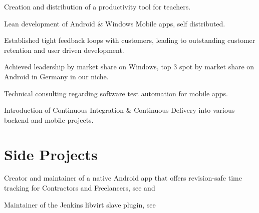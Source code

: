 \documentclass[]{resume}
\begin{document}
\begin{minipage}[t]{0.64\textwidth}
\begin{tightemize}
\item Creation and distribution of a productivity tool for teachers.
\item Lean development of Android \& Windows Mobile apps, self distributed.
\item Established tight feedback loops with customers, leading to outstanding customer retention and user driven development.
\item Achieved leadership by market share on Windows, top 3 spot by market share on Android in Germany in our niche.
\end{tightemize}
\sectionsep

\begin{tightemize}
\item Technical consulting regarding software test automation for mobile apps.
\item Introduction of Continuous Integration \& Continuous Delivery into various backend and mobile projects.
\end{tightemize}
\sectionsep



\section{Side Projects}

Creator and maintainer of a native Android app that offers revision-safe time tracking for Contractors and Freelancers, see \href{https://github.com/tastybug/timetracker}{} and \href{https://play.google.com/store/apps/details?id=com.tastybug.timetracker}{}
\sectionsep

Maintainer of the Jenkins libvirt slave plugin, see \href{https://wiki.jenkins.io/display/JENKINS/Libvirt+Slaves+Plugin}{}
\sectionsep

\end{minipage}
\end{document}
